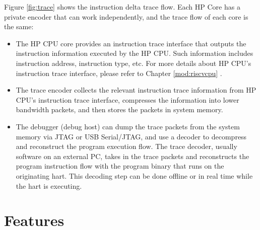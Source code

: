\documentclass[main\_\_EN.tex]{subfiles}
\begin{document}
Figure \ref{fig:trace} shows the instruction delta trace flow. Each HP Core has a private encoder that can work independently, and the trace flow of each core is the same:
\begin{itemize}
    \item The HP CPU core provides an instruction trace interface that outputs the instruction information executed by the HP CPU. Such information includes instruction address, instruction type, etc. For more details about \chipname{} HP CPU's instruction trace interface, please refer to Chapter \ref{mod:riscvcpu} \textit{}.
    \item The trace encoder collects the relevant instruction trace information from HP CPU's instruction trace interface, compresses the information into lower bandwidth packets, and then stores the packets in system memory.
    \item The debugger (debug host) can dump the trace packets from the system memory via JTAG or USB Serial/JTAG, and use a decoder to decompress and reconstruct the program execution flow. The trace decoder, usually software on an external PC, takes in the trace packets and reconstructs the program instruction flow with the program binary that runs on the originating hart. This decoding step can be done offline or in real time while the hart is executing.
\end{itemize}



\section{Features}
\label{sec:riscvtracenc-features}
\end{document}
